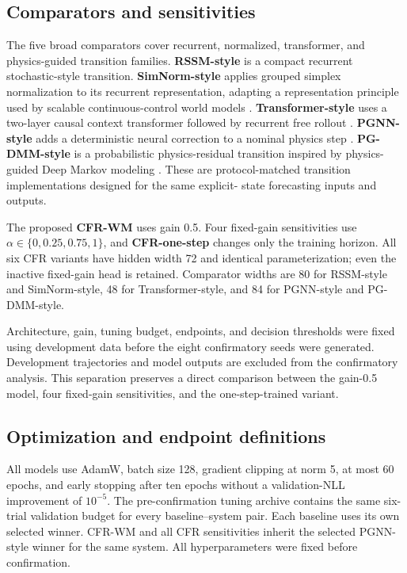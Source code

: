 \documentclass[iicol,pdflatex,sn-basic,Numbered]{sn-jnl}
\newcommand{\method}{CFR-WM}
\begin{document}
\subsection{Comparators and sensitivities}

The five broad comparators cover recurrent, normalized, transformer, and
physics-guided transition families. \textbf{RSSM-style} is a compact recurrent
stochastic-style transition. \textbf{SimNorm-style} applies grouped simplex
normalization to its recurrent representation, adapting a representation
principle used by scalable continuous-control world models
\cite{hansen2023_td_mpc2_scalable_robust_world}. \textbf{Transformer-style} uses a
two-layer causal context transformer followed by recurrent free rollout
\cite{micheli2022_transformers_are_sample_efficient_world}. \textbf{PGNN-style}
adds a deterministic neural correction to a nominal physics step
\cite{robinson2022_physics_guided_neural_networks_for}. \textbf{PG-DMM-style} is a
probabilistic physics-residual transition inspired by physics-guided Deep
Markov modeling \cite{liu2022_physics_guided_deep_markov_models}. These are
protocol-matched transition implementations designed for the same explicit-
state forecasting inputs and outputs.

The proposed \textbf{\method} uses gain 0.5. Four fixed-gain sensitivities use
$\alpha\in\{0,0.25,0.75,1\}$, and \textbf{CFR-one-step} changes only the
training horizon. All six CFR variants have hidden width 72 and identical
parameterization; even the inactive fixed-gain head is retained. Comparator
widths are 80 for RSSM-style and SimNorm-style, 48 for Transformer-style, and
84 for PGNN-style and PG-DMM-style.

Architecture, gain, tuning budget, endpoints, and decision thresholds were
fixed using development data before the eight confirmatory seeds were
generated. Development trajectories and model outputs are excluded from the
confirmatory analysis. This separation preserves a direct comparison between
the gain-0.5 model, four fixed-gain sensitivities, and the one-step-trained
variant.

\subsection{Optimization and endpoint definitions}

All models use AdamW, batch size 128, gradient clipping at norm 5, at most 60
epochs, and early stopping after ten epochs without a validation-NLL
improvement of $10^{-5}$. The pre-confirmation tuning archive contains the same
six-trial validation budget for every baseline--system pair. Each baseline uses
its own selected winner. CFR-WM and all CFR sensitivities inherit the selected PGNN-style
winner for the same system. All hyperparameters were fixed before confirmation.
\end{document}
